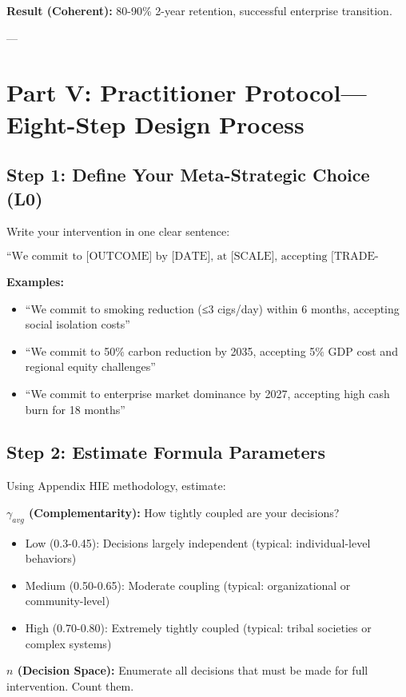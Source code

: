 \documentclass[11pt, a4paper]{article}
\begin{document}
\textbf{Result (Coherent):} 80-90\% 2-year retention, successful enterprise transition.

---

\section{Part V: Practitioner Protocol---Eight-Step Design Process} \label{sec:ch15-part5a}

\subsection{Step 1: Define Your Meta-Strategic Choice (L0)} \label{sec:ch15-part5b}

Write your intervention in one clear sentence:

$$\text{``We commit to [OUTCOME] by [DATE], at [SCALE], accepting [TRADE-OFFS]''}$$

\textbf{Examples:}
\begin{itemize}[nosep]
    \item ``We commit to smoking reduction (≤3 cigs/day) within 6 months, accepting social isolation costs''
    \item ``We commit to 50\% carbon reduction by 2035, accepting 5\% GDP cost and regional equity challenges''
    \item ``We commit to enterprise market dominance by 2027, accepting high cash burn for 18 months''
\end{itemize}

\subsection{Step 2: Estimate Formula Parameters} \label{sec:ch15-part5c}

Using Appendix HIE methodology, estimate:

\textbf{$\gamma_{avg}$ (Complementarity):} How tightly coupled are your decisions?
\begin{itemize}[nosep]
    \item Low (0.3-0.45): Decisions largely independent (typical: individual-level behaviors)
    \item Medium (0.50-0.65): Moderate coupling (typical: organizational or community-level)
    \item High (0.70-0.80): Extremely tightly coupled (typical: tribal societies or complex systems)
\end{itemize}

\textbf{$n$ (Decision Space):} Enumerate all decisions that must be made for full intervention. Count them.
\end{document}
